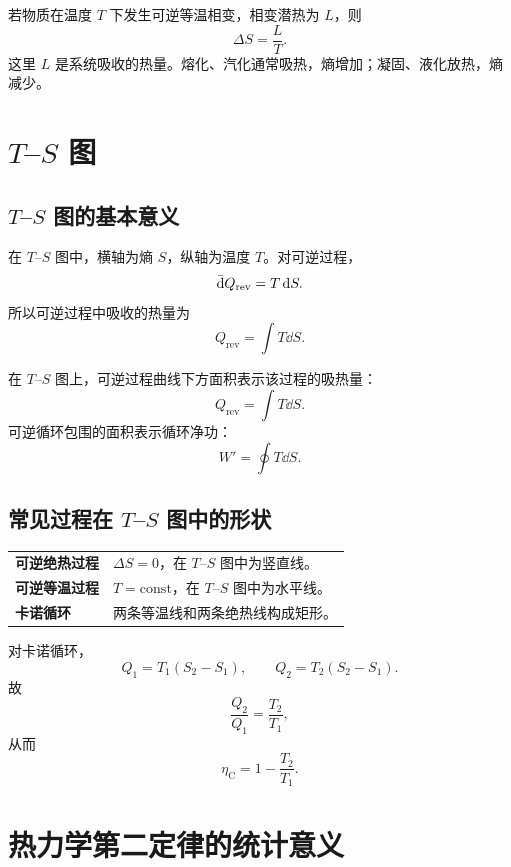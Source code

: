 若物质在温度 \(T\) 下发生可逆等温相变，相变潜热为 \(L\)，则
\[
  \boxed{
  \Delta S=\frac{L}{T}
  }.
\]
这里 \(L\) 是系统吸收的热量。熔化、汽化通常吸热，熵增加；凝固、液化放热，熵减少。

\section{\texorpdfstring{\(T\)--\(S\)}{T-S} 图}

\subsection{\texorpdfstring{\(T\)--\(S\)}{T-S} 图的基本意义}

在 \(T\)--\(S\) 图中，横轴为熵 \(S\)，纵轴为温度 \(T\)。对可逆过程，
\[
  \mathop{}\!\bar{\mathrm{d}} Q_{\mathrm{rev}}=T\mathop{}\!\mathrm{d} S.
\]
所以可逆过程中吸收的热量为
\[
  \boxed{
  Q_{\mathrm{rev}}=\int T\dd S
  }.
\]

\begin{KeyBox}[\(T\)--\(S\) 图中的面积]
在 \(T\)--\(S\) 图上，可逆过程曲线下方面积表示该过程的吸热量：
\[
  Q_{\mathrm{rev}}=\int T\dd S.
\]
可逆循环包围的面积表示循环净功：
\[
  W'=\oint T\dd S.
\]
\end{KeyBox}

\subsection{常见过程在 \texorpdfstring{\(T\)--\(S\)}{T-S} 图中的形状}

\begin{FormulaBox}[常见图像]
\begin{tabularx}{\textwidth}{@{}>{\bfseries}lX@{}}
可逆绝热过程 & \(\Delta S=0\)，在 \(T\)--\(S\) 图中为竖直线。\\
可逆等温过程 & \(T=\mathrm{const}\)，在 \(T\)--\(S\) 图中为水平线。\\
卡诺循环 & 两条等温线和两条绝热线构成矩形。\\
\end{tabularx}
\end{FormulaBox}

对卡诺循环，
\[
  Q_1=T_1(S_2-S_1),
  \qquad
  Q_2=T_2(S_2-S_1).
\]
故
\[
  \frac{Q_2}{Q_1}=\frac{T_2}{T_1},
\]
从而
\[
  \eta_{\mathrm C}=1-\frac{T_2}{T_1}.
\]

\section{热力学第二定律的统计意义}

